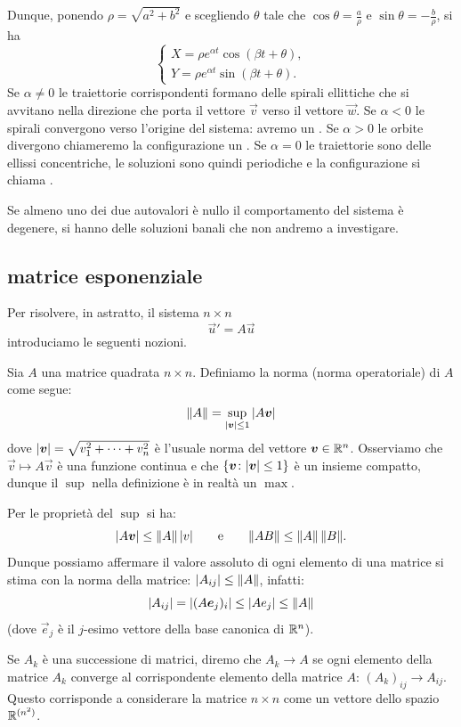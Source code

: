 Dunque, ponendo $\rho=\sqrt{a^2+b^2}$ e scegliendo $\theta$
tale che $\cos \theta = \frac a \rho$ e $\sin \theta = - \frac b \rho$,
si ha
\[
  \begin{cases}
   X = \rho e^{\alpha t} \cos(\beta t + \theta),\\
   Y = \rho e^{\alpha t} \sin(\beta t + \theta).
  \end{cases}
\]
Se $\alpha \neq 0$ le traiettorie corrispondenti formano delle spirali
ellittiche che si avvitano nella direzione che porta il vettore $\vec v$ verso
il vettore $\vec w$. Se $\alpha < 0$ le spirali convergono verso l'origine del
sistema: avremo un . Se $\alpha >0$ le orbite
divergono chiameremo la configurazione un .
Se $\alpha = 0$ le traiettorie sono delle ellissi concentriche,
le soluzioni sono quindi periodiche e la configurazione
si chiama .

Se almeno uno dei due autovalori è nullo il comportamento del sistema è degenere,
si hanno delle soluzioni banali che non andremo a investigare.

\subsection{matrice esponenziale}

Per risolvere, in astratto, il sistema $n\times n$
\[
  \vec u' = A \vec u
\]
introduciamo le seguenti nozioni.

Sia $A$ una matrice quadrata $n\times n$. Definiamo la norma (norma
operatoriale) di $A$ come segue:
\[
  {\left\Vert  A \right\Vert} = \sup_{{\left|\boldsymbol v\right|} \le 1} {\left|A\boldsymbol v\right|}
\]
dove ${\left| \boldsymbol v\right|} = \sqrt{v_1^2+ \dots + v_n^2}$ è l'usuale norma del
vettore $\boldsymbol v\in \mathbb R^n$.
Osserviamo che $\vec v\mapsto A\vec v$ è una funzione
continua e che ${\left\{ \boldsymbol v\colon {\left| \boldsymbol v\right|} \le 1 \right\}}$ è un insieme
compatto, dunque il $\sup$ nella definizione è in realtà un $\max$.

Per le proprietà del $\sup$ si ha:
\[
  {\left|A\boldsymbol v\right|} \le {\left\Vert  A \right\Vert}\, {\left| v \right|}
\qquad\text{e}\qquad
  {\left\Vert  A B \right\Vert} \le {\left\Vert  A \right\Vert} \, {\left\Vert  B \right\Vert}.
\]
Dunque possiamo affermare il valore assoluto di ogni elemento di una
matrice si stima con la norma della matrice: ${\left| A_{ij}\right|} \le
{\left\Vert  A \right\Vert}$, infatti:
\[
  {\left| A_{ij} \right|} = {\left| (A \boldsymbol e_j)_i\right|} \le {\left| A e_j\right|}
  \le {\left\Vert  A \right\Vert}
\]
(dove $\vec e_j$ è il $j$-esimo vettore della base canonica di $\mathbb R^n$).

Se $A_k$ è una successione di matrici, diremo che $A_k\to A$ se ogni
elemento della matrice $A_k$ converge al corrispondente elemento della
matrice $A$: $(A_k)_{ij} \to A_{ij}$. Questo corrisponde a considerare
la matrice $n\times n$ come un vettore dello spazio $\mathbb R^{(n^2)}$.

